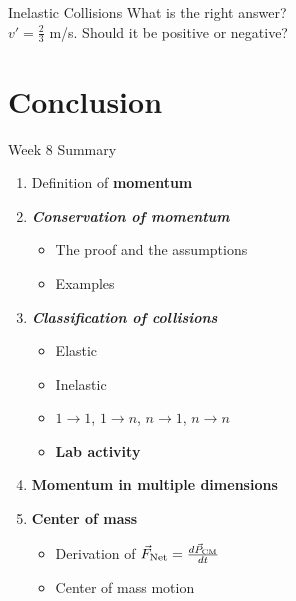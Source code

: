 \documentclass{beamer}
\begin{document}
\begin{frame}{Inelastic Collisions}
What is the right answer? \\ \vspace{0.5cm}
$v' = \frac{2}{3}$ m/s.  Should it be positive or negative?
\end{frame}

\section{Conclusion}

\begin{frame}{Week 8 Summary}
\begin{enumerate}
\item Definition of \alert{\textbf{momentum}}
\item \alert{\textbf{\textit{Conservation of momentum}}}
\begin{itemize}
\item The proof and the assumptions
\item Examples
\end{itemize}
\item \alert{\textbf{\textit{Classification of collisions}}}
\begin{itemize}
\item Elastic
\item Inelastic
\item $1 \rightarrow 1$, $1 \rightarrow n$, $n \rightarrow 1$, $n \rightarrow n$
\item \textbf{Lab activity}
\end{itemize}
\item \textbf{Momentum in multiple dimensions}
\item \textbf{Center of mass}
\begin{itemize}
\item Derivation of $\vec{F}_{\rm Net} = \frac{d\vec{P}_{\rm CM}}{dt}$
\item Center of mass motion
\end{itemize}
\end{enumerate}
\end{frame}
\end{document}

